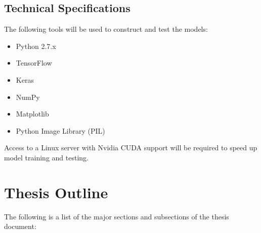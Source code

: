 \documentclass{article}
\begin{document}
	\subsection{Technical Specifications}
	
	The following tools will be used to construct and test the models:
	
	\begin{itemize}
		\item Python 2.7.x
		\item TensorFlow
		\item Keras
		\item NumPy
		\item Matplotlib
		\item Python Image Library (PIL)
	\end{itemize}
	
	Access to a Linux server with Nvidia CUDA support will be required to speed up model training and testing.
	
	\section{Thesis Outline}
	
	The following is a list of the major sections and subsections of the thesis document:
	
\end{document}
